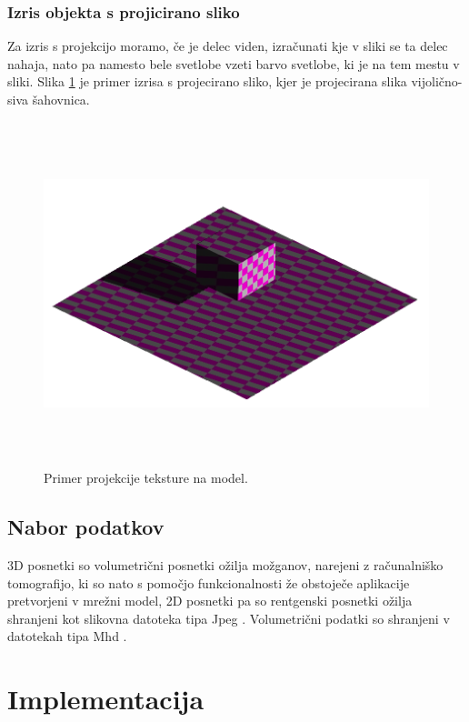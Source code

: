 \documentclass[a4paper, 12pt]{book}
\begin{document}
\subsection*{Izris objekta s projicirano sliko}
Za izris s projekcijo moramo, če je delec viden, izračunati kje v sliki se ta delec nahaja, nato pa namesto bele svetlobe vzeti barvo svetlobe, ki je na tem mestu v sliki. Slika \ref{teksturaprojecirananamodel} je primer izrisa s projecirano sliko, kjer je projecirana slika vijolično-siva šahovnica.

\begin{figure}[h]
\begin{center}
\includegraphics[width=12cm, height=10cm, keepaspectratio=true]{Tekstura_projecirana_na_model.png}
\end{center}
\caption{Primer projekcije teksture na model.}
\label{teksturaprojecirananamodel}
\end{figure}

\section{Nabor podatkov}
3D posnetki so volumetrični posnetki ožilja možganov, narejeni z računalniško tomografijo, ki so nato s pomočjo funkcionalnosti že obstoječe aplikacije pretvorjeni v mrežni model, 2D posnetki pa so rentgenski posnetki ožilja shranjeni kot slikovna datoteka tipa Jpeg \cite{jpeg}. Volumetrični podatki so shranjeni v datotekah tipa Mhd \cite{mhd}.


\chapter{Implementacija}
\end{document}
